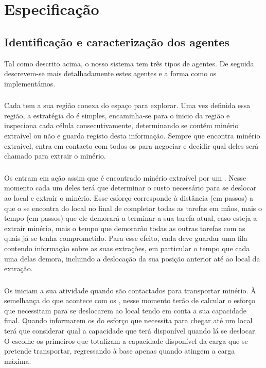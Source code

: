 \documentclass[12pt]{report}
\begin{document}
\chapter{Especificação}

\section{Identificação e caracterização dos agentes}


Tal como descrito acima, o nosso sistema tem três tipos de agentes. De seguida descrevem-se mais detalhadamente estes agentes e a forma como os implementámos.

\subsection{\Spotter}
Cada \spotter tem a sua região conexa do espaço para explorar. Uma vez definida essa região, a estratégia do \Spotter é simples, encaminha-se para o inicio da região e inspeciona cada célula consecutivamente, determinando se contém minério extraível ou não e guarda registo desta informação. Sempre que encontra minério extraível, entra em contacto com todos os \producers para negociar e decidir qual deles será chamado para extrair o minério.

\subsection{\Producer}
Os \producers entram em ação assim que é encontrado minério extraível por um \spotter. Nesse momento cada um deles terá que determinar o custo necessário para se deslocar ao local e extrair o minério. Esse esforço corresponde à distância (em passos) a que o \producer se encontra do local no final de completar todas as tarefas em mãos, mais o tempo (em passos) que ele demorará a terminar a sua tarefa atual, caso esteja a extrair minério, mais o tempo que demorarão todas as outras tarefas com as quais já se tenha comprometido. Para esse efeito, cada \producer deve guardar uma fila contendo informação sobre as suas extrações, em particular o tempo que cada uma delas demora, incluindo a deslocação da sua posição anterior até ao local da extração.

\subsection{\Transporter}
Os \transporters iniciam a sua atividade quando são contactados para transportar minério. À semelhança do que acontece com os \producers, nesse momento terão de calcular o esforço que necessitam para se deslocarem ao local tendo em conta a sua capacidade final. Quando informarem os \producers do esforço que necessita para chegar até um local terá que considerar qual a capacidade que terá disponível quando lá se deslocar. O \producer escolhe os primeiros \transporters que totalizam a capacidade disponível da carga que se pretende transportar, regressando à base apenas quando atingem a carga máxima. 
\end{document}
